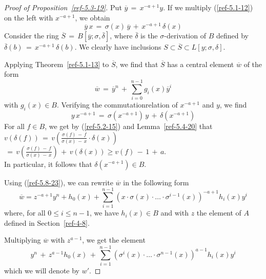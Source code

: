 \documentclass{amsart}
\numberwithin{equation}{section}
\theoremstyle{definition}
\theoremstyle{remark}
\begin{document}
\begin{proof}[Proof of Proposition~\ref{ref-5.3-19}]
    Put $\overline{y} \,=\, x^{-a+1}y$. If we multiply (\ref{ref-5.1-12})
    on the left with $x^{-a+1}$, we 
    obtain
    \begin{equation} \label{ref-5.6-21}
        \overline{y}\,x \,=\, \sigma(x) \, \overline{y} \,+\, x^{-a+1} \, 
        \delta(x)
    \end{equation}
    Consider the ring $\overline{S} \,=\, 
    B[\overline{y};\sigma,\overline{\delta}]$, where 
    $\overline{\delta}$ is the $\sigma$-derivation of $B$ defined by 
    $\overline{\delta}(b) \,=\, x^{-a+1} \, \delta(b)$.
     We clearly have inclusions $S \subset \overline{S} \subset 
    L[y;\sigma,\delta]$.
    
 Applying Theorem~\ref{ref-5.1-13} to $\overline{S}$, we find 
    that $\overline{S}$ has a central element $\overline{w}$ of the 
    form 
    \begin{equation} \label{ref-5.7-22}
        \overline{w} \,=\, \overline{y}^{n} \,+\, \sum_{i=0}^{n-1} g_{i}(x) 
        \overline{y}^{i}
    \end{equation}
    with $g_{i}(x) \in B$.
     Verifying the commutationrelation of $x^{-a+1}$ and $y$, we 
    find 
    \begin{equation} \label{ref-5.8-23}
        y\,x^{-a+1} \,=\, \sigma(x^{-a+1}) \, y \,+\, \delta(x^{-a+1})
    \end{equation}
    For all $f \in B$, we get by (\ref{ref-5.2-15}) and Lemma~\ref{ref-5.4-20} that $v(\delta(f)) \,=\, \displaystyle{v \left( \frac{ 
    \sigma(f) \,-\, f}{\sigma(x) \,-\, x} \cdot \delta(x) \right)}$ 
    \\ $\,=\, \displaystyle{v \left( \frac{\sigma(f) \,-\, f}{\sigma(x) \,-\, x} 
    \right) \,+\, v(\delta(x))} \geq v(f) \,-\, 1 \,+\, a$. 
    \\ In particular, it follows that $\delta(x^{-a+1}) \in B$.
    
 Using (\ref{ref-5.8-23}), we can rewrite $\overline{w}$ in the 
    following form
    \[\overline{w} = z^{-a+1}y^{n} + h_{0}(x) + \sum_{i=1}^{n-1} (x 
    \cdot \sigma(x) \cdot \ldots \cdot \sigma^{i-1}(x))^{-a+1} 
    h_{i}(x) y^{i} \]
    where, for all $0 \leq i \leq n-1$, we have $h_{i}(x) \in B$ and 
    with $z$ the element of $A$ defined in Section~\ref{ref-4-8}.
    
 Multiplying $\overline{w}$ with $z^{a-1}$, we get the element 
    \[y^{n} \,+\, z^{a-1}h_{0}(x) \,+\, \sum_{i=1}^{n-1} 
    (\sigma^{i}(x) \cdot \ldots \cdot 
    \sigma^{n-1}(x))^{a-1}h_{i}(x)y^{i}\] 
    which we will denote by $w'$.
   

\end{proof}
\end{document}
